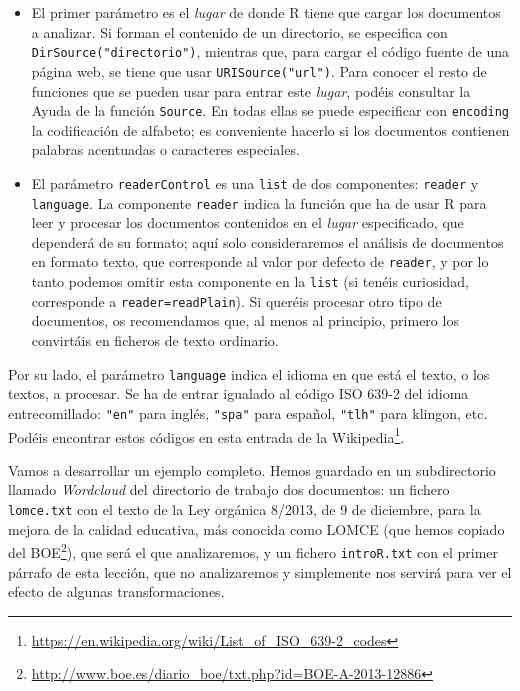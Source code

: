 \documentclass[
]{book}
\DeclareRobustCommand{\href}[2]{#2\footnote{\url{#1}}}
\theoremstyle{definition}
\theoremstyle{definition}
\theoremstyle{definition}
\theoremstyle{remark}
\begin{document}
\begin{itemize}
\item
  El primer parámetro es el \emph{lugar} de donde R tiene que cargar los documentos a analizar. Si forman el contenido de un directorio, se especifica con \texttt{DirSource("directorio")}, mientras que, para cargar el código fuente de una página web, se tiene que usar \texttt{URISource("url")}.
  Para conocer el resto de funciones que se pueden usar para entrar este \emph{lugar}, podéis consultar la Ayuda de la función \texttt{Source}. En todas ellas se puede especificar con \texttt{encoding} la codificación de alfabeto; es conveniente hacerlo si los documentos contienen palabras acentuadas o caracteres especiales.
\item
  El parámetro \texttt{readerControl} es una \texttt{list} de dos componentes: \texttt{reader} y \texttt{language}. La componente \texttt{reader} indica la función que ha de usar R para leer y procesar los documentos contenidos en el \emph{lugar} especificado, que dependerá de su formato; aquí solo consideraremos el análisis de documentos en formato texto, que corresponde al valor por defecto de \texttt{reader}, y por lo tanto podemos omitir esta componente en la \texttt{list} (si tenéis curiosidad, corresponde a \texttt{reader=readPlain}). Si queréis procesar otro tipo de documentos, os recomendamos que, al menos al principio, primero los convirtáis en ficheros de texto ordinario.
\end{itemize}

Por su lado, el parámetro \texttt{language} indica el idioma en que está el texto, o los textos, a procesar. Se ha de entrar igualado al código ISO 639-2 del idioma entrecomillado: \texttt{"en"} para inglés, \texttt{"spa"} para español, \texttt{"tlh"} para klingon, etc. Podéis encontrar estos códigos en \href{https://en.wikipedia.org/wiki/List_of_ISO_639-2_codes}{esta entrada de la Wikipedia}.

Vamos a desarrollar un ejemplo completo. Hemos guardado en un subdirectorio llamado \emph{Wordcloud} del directorio de trabajo dos documentos: un fichero \texttt{lomce.txt} con el texto de la Ley orgánica 8/2013, de 9 de diciembre, para la mejora de la calidad educativa, más conocida como LOMCE (que hemos copiado del \href{http://www.boe.es/diario_boe/txt.php?id=BOE-A-2013-12886}{BOE}), que será el que analizaremos, y un fichero \texttt{introR.txt} con el primer párrafo de esta lección, que no analizaremos y simplemente nos servirá para ver el efecto de algunas transformaciones.
\end{document}
